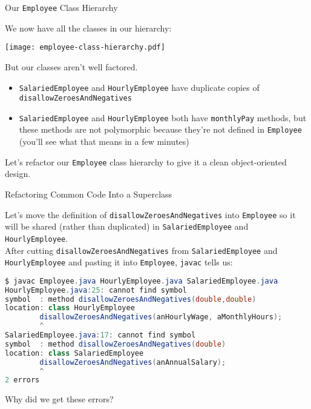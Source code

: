 \documentclass{beamer}
\begin{document}
\begin{frame}[fragile]{Our {\tt Employee} Class Hierarchy}


We now have all the classes in our hierarchy:
\vspace{-.1in}
\begin{center}
\texttt{[image: employee-class-hierarchy.pdf]}
\end{center}
\vspace{-.2in}
But our classes aren't well factored.
\begin{itemize}
\item {\tt SalariedEmployee} and {\tt HourlyEmployee} have duplicate copies of {\tt disallowZeroesAndNegatives}
\item {\tt SalariedEmployee} and {\tt HourlyEmployee} both have {\tt monthlyPay} methods, but these methods are not polymorphic because they're not defined in {\tt Employee} (you'll see what that means in a few minutes)
\end{itemize}

Let's refactor our {\tt Employee} class hierarchy to give it a clean object-oriented design.

\end{frame}

\begin{frame}[fragile]{Refactoring Common Code Into a Superclass}


Let's move the definition of {\tt disallowZeroesAndNegatives} into {\tt Employee} so it will be shared (rather than duplicated) in {\tt SalariedEmployee} and {\tt HourlyEmployee}.\\
\vspace{.05in}
After cutting {\tt disallowZeroesAndNegatives} from {\tt SalariedEmployee} and {\tt HourlyEmployee} and pasting it into {\tt Employee}, {\tt javac} tells us:
\vspace{-.1in}
\begin{lstlisting}[language=Java]
$ javac Employee.java HourlyEmployee.java SalariedEmployee.java
HourlyEmployee.java:25: cannot find symbol
symbol  : method disallowZeroesAndNegatives(double,double)
location: class HourlyEmployee
        disallowZeroesAndNegatives(anHourlyWage, aMonthlyHours);
        ^
SalariedEmployee.java:17: cannot find symbol
symbol  : method disallowZeroesAndNegatives(double)
location: class SalariedEmployee
        disallowZeroesAndNegatives(anAnnualSalary);
        ^
2 errors
\end{lstlisting}
\vspace{-.1in}
Why did we get these errors?

\end{frame}
\end{document}
